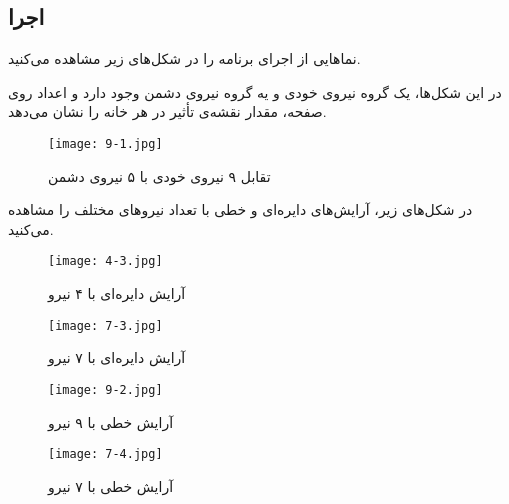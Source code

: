 \newpage

\subsection{اجرا}
نماهایی از اجرای برنامه را در شکل‌های زیر مشاهده می‌کنید.

در این شکل‌ها، یک گروه نیروی خودی و یه گروه نیروی دشمن وجود دارد و اعداد روی صفحه، مقدار نقشه‌ی تأثیر
در هر خانه را نشان می‌دهد.
\begin{figure}[htb]
  \begin{center}
    \texttt{[image: 9-1.jpg]}
    \caption{تقابل ۹ نیروی خودی با ۵ نیروی دشمن
    \label{fig9-1}}
  \end{center}
\end{figure}

در شکل‌های زیر، آرایش‌های دایره‌ای و خطی با تعداد نیروهای مختلف را مشاهده می‌کنید.
\begin{figure}[htb]
  \begin{center}
    \texttt{[image: 4-3.jpg]}
    \caption{آرایش دایره‌ای با ۴ نیرو
    \label{fig4-3}}
  \end{center}
\end{figure}

\begin{figure}[htb]
  \begin{center}
    \texttt{[image: 7-3.jpg]}
    \caption{آرایش دایره‌ای با ۷ نیرو
    \label{fig7-3}}
  \end{center}
\end{figure}

\begin{figure}[htb]
  \begin{center}
    \texttt{[image: 9-2.jpg]}
    \caption{آرایش خطی با ۹ نیرو
    \label{fig9-2}}
  \end{center}
\end{figure}

\begin{figure}[htb]
  \begin{center}
    \texttt{[image: 7-4.jpg]}
    \caption{آرایش خطی با ۷ نیرو
    \label{fig7-4}}
  \end{center}
\end{figure}








